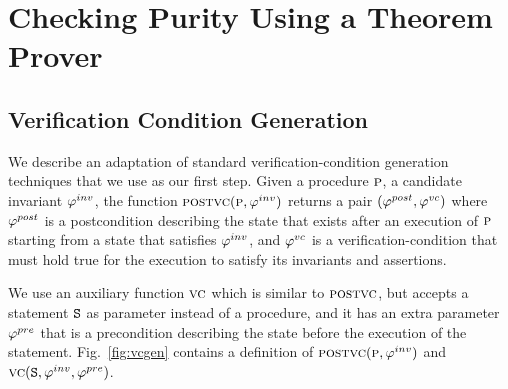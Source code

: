 \newcommand{\existformula}{\psi^e}
\newcommand{\EA}{\textsc{ea}}
\newcommand{\IW}{\textsc{iw}}

\newcommand{\initformula}{\logicalformula{init}}

\section{Checking Purity Using a Theorem Prover}




\subsection{Verification Condition Generation}

We describe an adaptation of standard verification-condition generation techniques that we use as our first step.
Given a procedure $\textsc{p}$, a candidate invariant $\varphi^{inv}$, the function $\textsc{postvc}({\textsc{p}},{\varphi^{inv}})$ returns a
pair $(\varphi^{post},\varphi^{vc})$ where $\varphi^{post}$ is a postcondition describing the state that exists after an execution of
$\textsc{p}$ starting from a state that satisfies $\varphi^{inv}$, and $\varphi^{vc}$ is a verification-condition that must hold true
for the execution to satisfy its invariants and assertions.

We use an auxiliary function $\textsc{vc}$ which is similar to $\textsc{postvc}$, but accepts a statement $\texttt{S}$ as
parameter instead of a procedure, and it has an extra parameter $\varphi^{pre}$ that is a precondition describing
the state before the execution of the statement.
Fig.~\ref{fig:vcgen} contains a definition of $\textsc{postvc}({\textsc{p}},{\varphi^{inv}})$  and  $\textsc{vc}({\texttt{S}},{\varphi^{inv}},{\varphi^{pre}})$.

